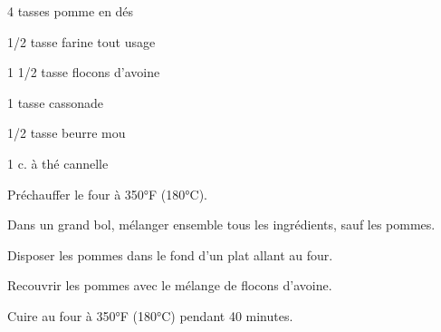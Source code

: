 %
%   
%   
%   
%




\totaltime{}


\begin{ingredients}
    \item 4 tasses pomme en dés
    \item 1/2 tasse farine tout usage
    \item 1 1/2 tasse flocons d'avoine
    \item 1 tasse cassonade
    \item 1/2 tasse beurre mou
    \item 1 c. à thé cannelle
\end{ingredients}

\begin{steps}
    \item Préchauffer le four à 350°F (180°C).
    \item Dans un grand bol, mélanger ensemble tous les ingrédients, sauf les pommes.
    \item Disposer les pommes dans le fond d'un plat allant au four.
    \item Recouvrir les pommes avec le mélange de flocons d'avoine.
    \item Cuire au four à 350°F (180°C) pendant 40 minutes.
\end{steps}
